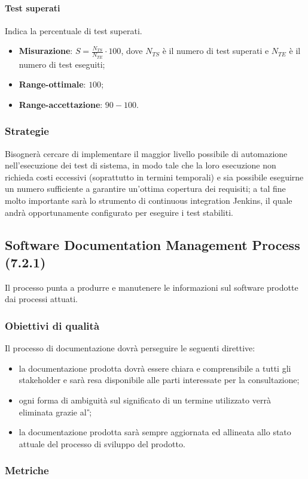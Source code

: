 \paragraph{Test superati}
\label{tsuperati}
Indica la percentuale di test superati.
\begin{itemize}
\item \textbf{Misurazione}: $S=\frac{N_{TS}}{N_{TE}} \cdot 100$, dove $N_{TS}$ è il numero di test superati e $N_{TE}$ è il numero di test eseguiti;
\item \textbf{Range-ottimale}: $100$;
\item \textbf{Range-accettazione}: $90 - 100$.
\end{itemize}
\subsubsection{Strategie}
Bisognerà cercare di implementare il maggior livello possibile di automazione nell'esecuzione dei test di sistema, in modo tale che la loro esecuzione non richieda costi eccessivi (soprattutto in termini temporali) e sia possibile eseguirne un numero sufficiente a garantire un'ottima copertura dei requisiti; a tal fine molto importante sarà lo strumento di continuous integration Jenkins, il quale andrà opportunamente configurato per eseguire i test stabiliti.
\subsection{Software Documentation Management Process (7.2.1)}
\label{soDocMgmt}
Il processo punta a produrre e manutenere le informazioni sul software prodotte dai processi attuati.
\subsubsection{Obiettivi di qualità}
Il processo di documentazione dovrà perseguire le seguenti direttive:
\begin{itemize}
\item la documentazione prodotta dovrà essere chiara e comprensibile a tutti gli stakeholder e sarà resa disponibile alle parti interessate per la consultazione;
\item ogni forma di ambiguità sul significato di un termine utilizzato verrà eliminata grazie al \textit{\G};
\item la documentazione prodotta sarà sempre aggiornata ed allineata allo stato attuale del processo di sviluppo del prodotto.
\end{itemize}
\subsubsection{Metriche}
